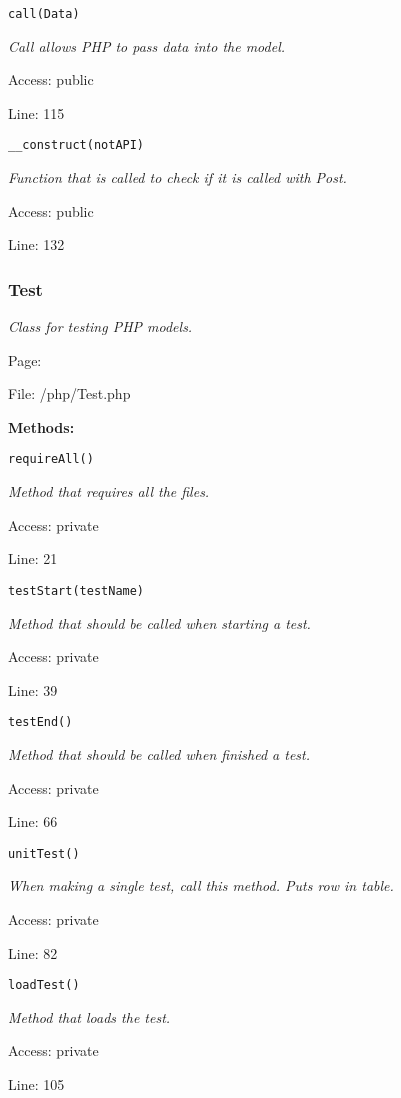 \texttt{call(Data)}

{\scriptsize
\textit{Call allows PHP to pass data into the model.}

Access: public

Line: 115

}

\texttt{\_\_construct(notAPI)}

{\scriptsize
\textit{Function that is called to check if it is called with Post.}

Access: public

Line: 132

}

\subsubsection{Test}\label{Test.php.doc}
\textit{Class for testing PHP models.}

Page: \pageref{Test.php}

File: /php/Test.php

\textbf{Methods:}

\texttt{requireAll()}

{\scriptsize
\textit{Method that requires all the files.}

Access: private

Line: 21

}

\texttt{testStart(testName)}

{\scriptsize
\textit{Method that should be called when starting a test.}

Access: private

Line: 39

}

\texttt{testEnd()}

{\scriptsize
\textit{Method that should be called when finished a test.}

Access: private

Line: 66

}

\texttt{unitTest()}

{\scriptsize
\textit{When making a single test, call this method.
Puts row in table.}

Access: private

Line: 82

}

\texttt{loadTest()}

{\scriptsize
\textit{Method that loads the test.}

Access: private

Line: 105

}

